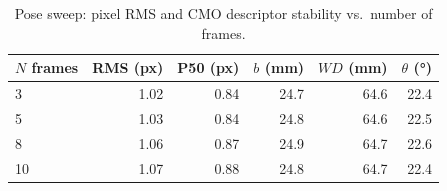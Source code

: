\begin{table}[H]
\centering
\caption{Pose sweep: pixel RMS and CMO descriptor stability vs.\ number of frames.}
\label{tab:pose_sweep}
\begin{tabular}{lrrrrr}
\toprule
$N$ frames & RMS (px) & P50 (px) & $b$ (mm) & $WD$ (mm) & $\theta$ (\si{\degree}) \\
\midrule
3 & 1.02 & 0.84 & 24.7 & 64.6 & 22.4 \\
5 & 1.03 & 0.84 & 24.8 & 64.6 & 22.5 \\
8 & 1.06 & 0.87 & 24.9 & 64.7 & 22.6 \\
10 & 1.07 & 0.88 & 24.8 & 64.7 & 22.4 \\
\bottomrule
\end{tabular}
\end{table}
